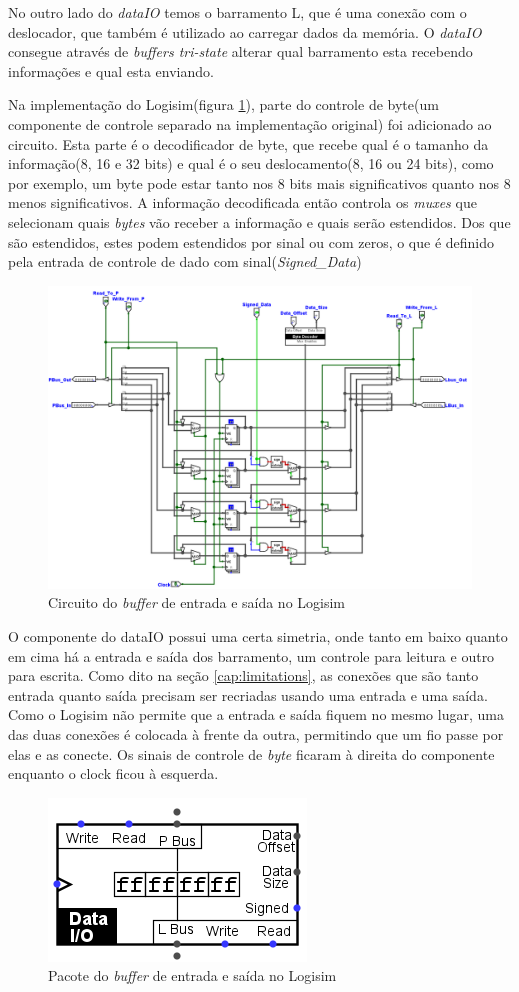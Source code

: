 \documentclass[
	article,			%
	11pt,				%
	oneside,			%
	a4paper,			%
	english,			%
	brazil,				%
	sumario=tradicional
	]{abntex2}
\begin{document}
No outro lado do \textit{dataIO} temos o barramento L, que é uma conexão com o deslocador, que também é utilizado ao carregar dados da memória. O \textit{dataIO} consegue através de \textit{buffers tri-state} alterar qual barramento esta recebendo informações e qual esta enviando. 

Na implementação do Logisim(figura \ref{fig:dataio}), parte do controle de byte(um componente de controle separado na implementação original) foi adicionado ao circuito. Esta parte é o decodificador de byte, que recebe qual é o tamanho da informação(8, 16 e 32 bits) e qual é o seu deslocamento(8, 16 ou 24 bits), como por exemplo, um byte pode estar tanto nos 8 bits mais significativos quanto nos 8 menos significativos. A informação decodificada então controla os \textit{muxes} que selecionam quais \textit{bytes} vão receber a informação e quais serão estendidos. Dos que são estendidos, estes podem estendidos por sinal ou com zeros, o que é definido pela entrada de controle de dado com sinal(\textit{Signed\_Data})
\begin{figure}[H]
    \centering
    \includegraphics[width=0.75\linewidth]{Logisim/dataio.png}
    \caption{Circuito do \textit{buffer} de entrada e saída no Logisim}
    \label{fig:dataio}
\end{figure}
O componente do dataIO possui uma certa simetria, onde tanto em baixo quanto em cima há a entrada e saída dos barramento, um controle para leitura e outro para escrita. Como dito na seção \ref{cap:limitations}, as conexões que são tanto entrada quanto saída precisam ser recriadas usando uma entrada e uma saída. Como o Logisim não permite que a entrada e saída fiquem no mesmo lugar, uma das duas conexões é colocada à frente da outra, permitindo que um fio passe por elas e as conecte. Os sinais de controle de \textit{byte} ficaram à direita do componente enquanto o clock ficou à esquerda.
\begin{figure}[H]
    \centering
    \includegraphics[width=0.25\linewidth]{Logisim/dataioPack.png}
    \caption{Pacote do \textit{buffer} de entrada e saída no Logisim}
    \label{fig:dataioPack}
\end{figure}
\end{document}
